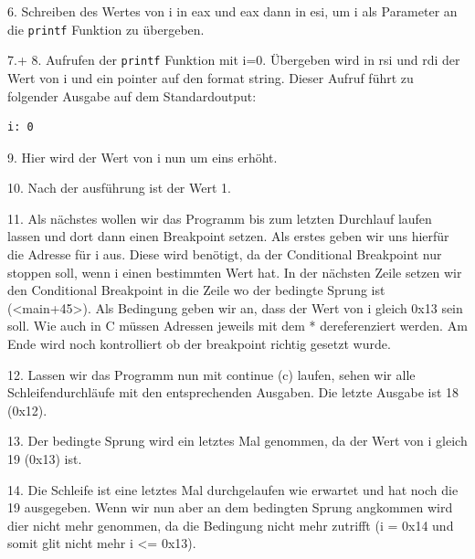 \documentclass[12pt]{article}
\begin{document}

6. Schreiben des Wertes von i in eax und eax dann in esi, um i als Parameter an die \texttt{printf} Funktion zu übergeben.


7.+ 8. Aufrufen der \texttt{printf} Funktion mit i=0. Übergeben wird in rsi und rdi der Wert von i und ein pointer auf den format string. Dieser Aufruf führt zu folgender Ausgabe auf dem Standardoutput:

\begin{lstlisting}
i: 0
\end{lstlisting}


9. Hier wird der Wert von i nun um eins erhöht.


10. Nach der ausführung ist der Wert 1.


11. Als nächstes wollen wir das Programm bis zum letzten Durchlauf laufen lassen und dort dann einen Breakpoint setzen. Als erstes geben wir uns hierfür die Adresse für i aus. Diese wird benötigt, da der Conditional Breakpoint nur stoppen soll, wenn i einen bestimmten Wert hat. In der nächsten Zeile setzen wir den Conditional Breakpoint in die Zeile wo der bedingte Sprung ist (<main+45>). Als Bedingung geben wir an, dass der Wert von i gleich 0x13 sein soll. Wie auch in C müssen Adressen jeweils mit dem * dereferenziert werden. Am Ende wird noch kontrolliert ob der breakpoint richtig gesetzt wurde.


12. Lassen wir das Programm nun mit continue (c) laufen, sehen wir alle Schleifendurchläufe mit den entsprechenden Ausgaben. Die letzte Ausgabe ist 18 (0x12).


13. Der bedingte Sprung wird ein letztes Mal genommen, da der Wert von i gleich 19 (0x13) ist.


14. Die Schleife ist eine letztes Mal durchgelaufen wie erwartet und hat noch die 19 ausgegeben. Wenn wir nun aber an dem bedingten Sprung angkommen wird dier nicht mehr genommen, da die Bedingung nicht mehr zutrifft (i = 0x14 und somit glit nicht mehr i <= 0x13).
\end{document}

